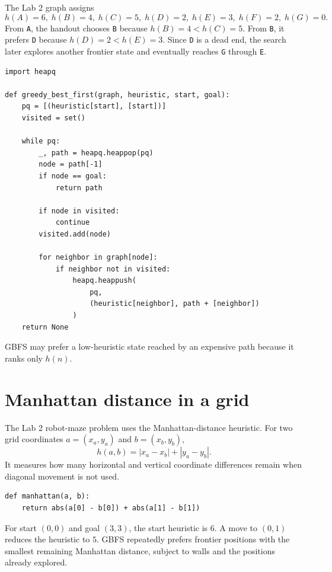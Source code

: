 The Lab 2 graph assigns
\[
h(A)=6,\; h(B)=4,\; h(C)=5,\; h(D)=2,\; h(E)=3,\; h(F)=2,\; h(G)=0.
\]
From \texttt{A}, the handout chooses \texttt{B} because \(h(B)=4<h(C)=5\). From \texttt{B}, it prefers \texttt{D} because \(h(D)=2<h(E)=3\). Since \texttt{D} is a dead end, the search later explores another frontier state and eventually reaches \texttt{G} through \texttt{E}.

\begin{lstlisting}[style=mlpython]
import heapq

def greedy_best_first(graph, heuristic, start, goal):
    pq = [(heuristic[start], [start])]
    visited = set()

    while pq:
        _, path = heapq.heappop(pq)
        node = path[-1]
        if node == goal:
            return path

        if node in visited:
            continue
        visited.add(node)

        for neighbor in graph[node]:
            if neighbor not in visited:
                heapq.heappush(
                    pq,
                    (heuristic[neighbor], path + [neighbor])
                )
    return None
\end{lstlisting}

\begin{pitfall}
GBFS may prefer a low-heuristic state reached by an expensive path because it ranks only \(h(n)\).
\end{pitfall}

\section{Manhattan distance in a grid}

The Lab 2 robot-maze problem uses the Manhattan-distance heuristic. For two grid coordinates \(a=(x_a,y_a)\) and \(b=(x_b,y_b)\),
\[
h(a,b)=|x_a-x_b|+|y_a-y_b|.
\]
It measures how many horizontal and vertical coordinate differences remain when diagonal movement is not used.

\begin{lstlisting}[style=mlpython]
def manhattan(a, b):
    return abs(a[0] - b[0]) + abs(a[1] - b[1])
\end{lstlisting}

\begin{workedexample}
For start \((0,0)\) and goal \((3,3)\), the start heuristic is \(6\). A move to \((0,1)\) reduces the heuristic to \(5\). GBFS repeatedly prefers frontier positions with the smallest remaining Manhattan distance, subject to walls and the positions already explored.
\end{workedexample}

